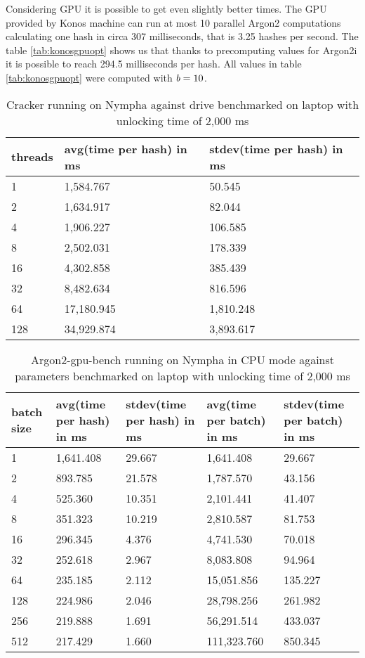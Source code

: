 \documentclass[nolof,digital]{fithesis3}
\begin{document}
Considering GPU it is possible to get even slightly better times. The GPU provided by Konos machine can run at most 10 parallel Argon2 computations calculating one hash in circa 307 milliseconds, that is 3.25 hashes per second. The table \ref{tab:konosgpuopt} shows us that thanks to precomputing values for Argon2i it is possible to reach 294.5 milliseconds per hash. All values in table \ref{tab:konosgpuopt} were computed with $\emph{b} = 10$.

\noindent
\begin{table}
\caption{Cracker running on Nympha against drive benchmarked on laptop with unlocking time of 2,000 ms}
\label{tab:nymphacracker}
\begin{tabularx}{\textwidth}{| X | X | X |}
\hline
threads & avg(time per hash) in ms & stdev(time per hash) in ms\\
\hline
1 & 1,584.767 & 50.545\\
\hline
2 & 1,634.917 & 82.044\\
\hline
4 & 1,906.227 & 106.585\\
\hline
8 & 2,502.031 & 178.339\\
\hline
16 & 4,302.858 & 385.439\\
\hline
32 & 8,482.634 & 816.596\\
\hline
64 & 17,180.945 & 1,810.248\\
\hline
128 & 34,929.874 & 3,893.617\\
\hline
\end{tabularx}
\end{table}

\noindent
\begin{table}
\caption{Argon2-gpu-bench running on Nympha in CPU mode against parameters benchmarked on laptop with unlocking time of 2,000 ms}
\label{tab:nymphacpu}
\begin{tabularx}{\textwidth}{| X | X | X | X | X |}
\hline
batch size & avg(time per hash) in ms & stdev(time per hash) in ms & avg(time per batch) in ms & stdev(time per batch) in ms\\
\hline
1 & 1,641.408 & 29.667 & 1,641.408 & 29.667\\
\hline
2 & 893.785 & 21.578 & 1,787.570 & 43.156\\
\hline
4 & 525.360 & 10.351 & 2,101.441 & 41.407\\
\hline
8 & 351.323 & 10.219 & 2,810.587 & 81.753\\
\hline
16 & 296.345 & 4.376 & 4,741.530 & 70.018\\
\hline
32 & 252.618 & 2.967 & 8,083.808 & 94.964\\
\hline
64 & 235.185 & 2.112 & 15,051.856 & 135.227\\
\hline
128 & 224.986 & 2.046 & 28,798.256 & 261.982\\
\hline
256 & 219.888 & 1.691 & 56,291.514 & 433.037\\
\hline
512 & 217.429 & 1.660 & 111,323.760 & 850.345\\
\hline
\end{tabularx}
\end{table}
\end{document}
